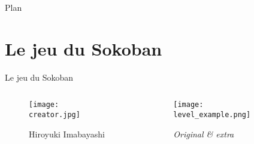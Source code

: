 




    \maketitle

    \begin{frame}{Plan}
        \tableofcontents%
    \end{frame}

    \section{Le jeu du Sokoban}
        \begin{frame}{Le jeu du Sokoban}
            \begin{columns}
                \begin{column}{0.3\textwidth}
                    \begin{figure}
                        \centering
                        \texttt{[image: creator.jpg]}
                        \caption*{Hiroyuki Imabayashi}
                    \end{figure}
                \end{column}
                \begin{column}{0.7\textwidth}
                    \begin{figure}
                        \centering
                        \texttt{[image: level\_example.png]}
                        \caption*{\textit{Original \& extra}}
                    \end{figure}
                \end{column}
            \end{columns}
        \end{frame}

